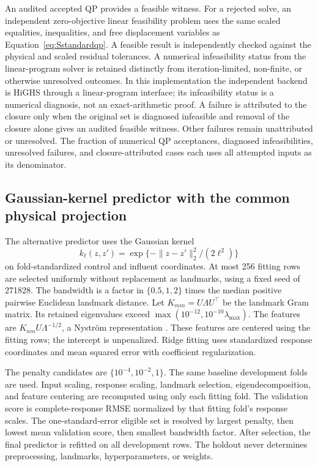 \documentclass[a4paper,fleqn]{cas-sc}
\begin{document}
An audited accepted QP provides a feasible witness. For a rejected solve, an independent zero-objective linear feasibility problem uses the same scaled equalities, inequalities, and free displacement variables as Equation~\eqref{eq:Sstandardqp}. A feasible result is independently checked against the physical and scaled residual tolerances. A numerical infeasibility status from the linear-program solver is retained distinctly from iteration-limited, non-finite, or otherwise unresolved outcomes. In this implementation the independent backend is HiGHS through a linear-program interface; its infeasibility status is a numerical diagnosis, not an exact-arithmetic proof. A failure is attributed to the closure only when the original set is diagnosed infeasible and removal of the closure alone gives an audited feasible witness. Other failures remain unattributed or unresolved. The fraction of numerical QP acceptances, diagnosed infeasibilities, unresolved failures, and closure-attributed cases each uses all attempted inputs as its denominator.

\subsection{Gaussian-kernel predictor with the common physical projection}

The alternative predictor uses the Gaussian kernel
\begin{equation}
 k_\ell(z,z')=\exp\{-\|z-z'\|_2^2/(2\ell^2)\}
\label{eq:Skernel}
\end{equation}
on fold-standardized control and influent coordinates. At most 256 fitting rows are selected uniformly without replacement as landmarks, using a fixed seed of 271828. The bandwidth is a factor in $\{0.5,1,2\}$ times the median positive pairwise Euclidean landmark distance. Let $K_{mm}=U\Lambda U^\top$ be the landmark Gram matrix. Its retained eigenvalues exceed $\max(10^{-12},10^{-10}\lambda_{\max})$. The features are $K_{nm}U\Lambda^{-1/2}$, a Nystr\"om representation \citep{WilliamsSeeger2001}. These features are centered using the fitting rows; the intercept is unpenalized. Ridge fitting uses standardized response coordinates and mean squared error with coefficient regularization.

The penalty candidates are $\{10^{-4},10^{-2},1\}$. The same baseline development folds are used. Input scaling, response scaling, landmark selection, eigendecomposition, and feature centering are recomputed using only each fitting fold. The validation score is complete-response RMSE normalized by that fitting fold's response scales. The one-standard-error eligible set is resolved by largest penalty, then lowest mean validation score, then smallest bandwidth factor. After selection, the final predictor is refitted on all development rows. The holdout never determines preprocessing, landmarks, hyperparameters, or weights.
\end{document}
